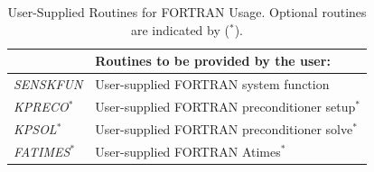 \documentclass[11pt]{article}
\begin{document}
\begin{table}
\caption{User-Supplied Routines for FORTRAN Usage. Optional routines
are indicated by ($^*$).}
\label{FUserMod}
\begin{center}
\begin{tabular}{|l|l|} \hline
  & Routines to be provided by the user: \\
\hline \hline
{\em SENSKFUN} & User-supplied FORTRAN system function \\ \hline
{\em KPRECO}$^*$ & User-supplied FORTRAN preconditioner setup$^*$ \\ \hline
{\em KPSOL}$^*$ & User-supplied FORTRAN preconditioner solve$^*$ \\ \hline
{\em FATIMES}$^*$ & User-supplied FORTRAN Atimes$^*$ \\ \hline
\end{tabular}
\end{center}
\end{table}
\end{document}
